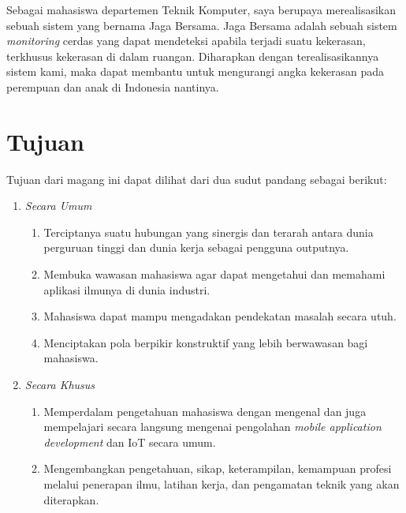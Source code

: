 Sebagai mahasiswa departemen Teknik Komputer, saya berupaya merealisasikan sebuah sistem yang bernama Jaga Bersama. Jaga Bersama adalah sebuah sistem \textit{monitoring} cerdas yang dapat mendeteksi apabila terjadi suatu kekerasan, terkhusus kekerasan di dalam ruangan. Diharapkan dengan terealisasikannya sistem kami, maka dapat membantu untuk mengurangi angka kekerasan pada perempuan dan anak di Indonesia nantinya.


\section{Tujuan}

Tujuan dari magang ini dapat dilihat dari dua
sudut pandang sebagai berikut:

\vspace{0.5ex}

\begin{enumerate}[nolistsep]

      \item \textit{Secara Umum}
            \vspace{0.5ex}

            \begin{enumerate}[nolistsep]
                  \item Terciptanya suatu hubungan yang sinergis dan terarah antara dunia
                        perguruan tinggi dan dunia kerja sebagai pengguna outputnya.

                  \item Membuka wawasan mahasiswa agar dapat mengetahui dan memahami
                        aplikasi ilmunya di dunia industri.

                  \item Mahasiswa dapat mampu mengadakan pendekatan masalah secara utuh.

                  \item Menciptakan pola berpikir konstruktif yang
                        lebih berwawasan bagi mahasiswa.

            \end{enumerate}

            \vspace{0.5ex}

      \item \textit{Secara Khusus}
            \vspace{0.5ex}

            \begin{enumerate}[nolistsep]
                  \item Memperdalam pengetahuan mahasiswa dengan mengenal dan juga mempelajari
                        secara langsung mengenai pengolahan \textit{mobile application development} dan IoT secara umum.

                  \item Mengembangkan pengetahuan, sikap, keterampilan, kemampuan profesi melalui
                        penerapan ilmu, latihan kerja, dan pengamatan teknik yang akan diterapkan.
            \end{enumerate}

\end{enumerate}

